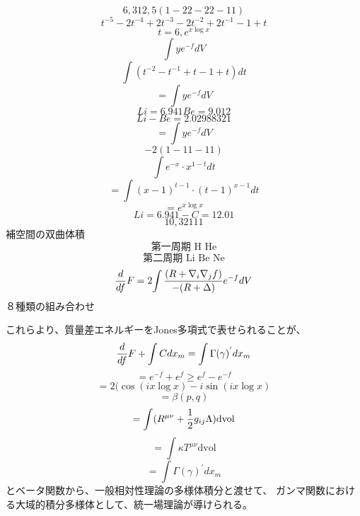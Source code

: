 \documentclass{jsarticle}
\begin{document}
\title{}
\author{}
\date{}
\maketitle
  
  $$ 6, 312, {5}(1 -2 2 -2 2 -1 1) $$
  $$ t^{-5} - 2t^{-4} + 2t^{-3} -2t^{-2} + 2t^{-1} - 1 + t $$
  $$ t=6, e^{x \log x} $$
  $$ \int y e^{-f}dV $$
  $$ \int(t^{-2} - t^{-1} + t - 1 + t)dt $$
  $$ = \int y e^{-f}dV $$
  $$ Li=6.941 Be=9.012 $$
  $$ Li - Be = 2.02988321$$
  $$ = \int y e^{-f}dV $$
  $$ {-2}(1 - 1 1 - 1 1) $$
  $$ \int e^{-x} \cdot x^{1 - t}dt $$
  $$ = \int (x - 1)^{t - 1}\cdot (t - 1)^{x - 1}dt $$
  $$ = e^{x \log x} $$
  $$ Li=6.941 - C=12.01 $$
  $$ 10, 3 2 1 1 1$$
  補空間の双曲体積
  $$ \text{第一周期 H    He} $$
  $$ \text{第二周期 Li Be    Ne} $$
  $$ {d \over df}F = 2{\int{{(R + \nabla_{i}\nabla_{j}f)} \over 
  {- (R + \Delta)}}}e^{-f}dV $$
  ８種類の組み合わせ

  これらより、質量差エネルギーをJones多項式で表せられることが、
  $$ {d \over df}F + \int C dx_m = \int \Gamma(\gamma)^{'}dx_m $$
  $$ = e^{-f} + e^{f} \ge e^{f} - e^{-f} $$
  $$ = 2(\cos(i x \log x) - i \sin(i x \log x) $$
  $$ = \beta(p,q) $$
  $$ = \int (R^{\mu\nu} + {1 \over 2}g_{ij}\Lambda) \mathrm{dvol} $$
  $$ = \int \kappa T^{\mu\nu} \mathrm{dvol} $$
  $$  = \int \Gamma(\gamma)^{'}dx_m $$
  とベータ関数から、一般相対性理論の多様体積分と渡せて、
  ガンマ関数における大域的積分多様体として、統一場理論が導けられる。
\end{document}
